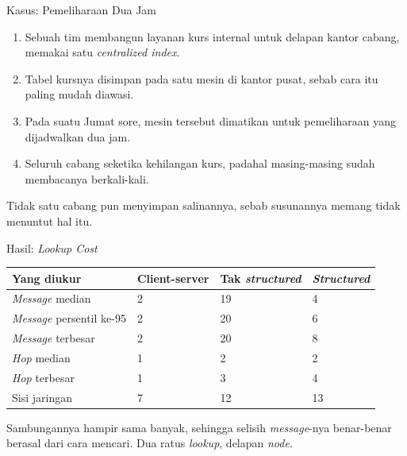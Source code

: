 \documentclass[aspectratio=169, table, 12pt]{beamer}
\begin{document}
\begin{frame}{{\Large Kasus: Pemeliharaan Dua Jam}}
  \vspace{8pt}
  \begin{enumerate}\small
    \item Sebuah tim membangun layanan kurs internal untuk delapan kantor
          cabang, memakai satu \textit{centralized index}.
    \item Tabel kursnya disimpan pada satu mesin di kantor pusat, sebab cara
          itu paling mudah diawasi.
    \item Pada suatu Jumat sore, mesin tersebut dimatikan untuk pemeliharaan
          yang dijadwalkan dua jam.
    \item Seluruh cabang seketika kehilangan kurs, padahal masing-masing sudah
          membacanya berkali-kali.
  \end{enumerate}

  \vspace{8pt}
  {\small Tidak satu cabang pun menyimpan salinannya, sebab susunannya memang
  tidak menuntut hal itu.}
\end{frame}

\begin{frame}{{\Large Hasil: \textit{Lookup Cost}}}
  \vspace{6pt}
  \centering
  \small
  \begin{tabularx}{0.95\textwidth}{|X|l|l|l|}
    \hline
    \textbf{Yang diukur} & \textbf{Client-server} & \textbf{Tak \textit{structured}} & \textbf{\textit{Structured}} \\
    \hline
    \textit{Message} median & 2 & 19 & 4 \\
    \hline
    \textit{Message} persentil ke-95 & 2 & 20 & 6 \\
    \hline
    \textit{Message} terbesar & 2 & 20 & 8 \\
    \hline
    \textit{Hop} median & 1 & 2 & 2 \\
    \hline
    \textit{Hop} terbesar & 1 & 3 & 4 \\
    \hline
    Sisi jaringan & 7 & 12 & 13 \\
    \hline
  \end{tabularx}

  \vspace{6pt}
  {\small Sambungannya hampir sama banyak, sehingga selisih \textit{message}-nya benar-benar
  berasal dari cara mencari. Dua ratus \textit{lookup}, delapan \textit{node}.}
\end{frame}
\end{document}
